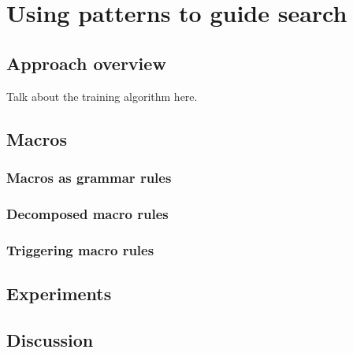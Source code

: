 \chapter{Using patterns to guide search}\label{chp:macro}

\section{Approach overview}
Talk about the training algorithm here.

\section{Macros}
\subsection{Macros as grammar rules}
\subsection{Decomposed macro rules}
\subsection{Triggering macro rules}

\section{Experiments}
\section{Discussion}

